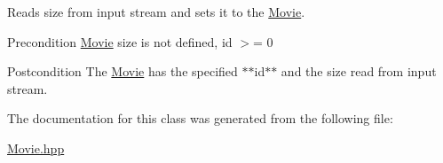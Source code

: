 Reads size from input stream and sets it to the \hyperlink{class_movie}{Movie}. 

\begin{DoxyPrecond}{Precondition}
\hyperlink{class_movie}{Movie} size is not defined, id $>$= 0 
\end{DoxyPrecond}
\begin{DoxyPostcond}{Postcondition}
The \hyperlink{class_movie}{Movie} has the specified $\ast$$\ast$id$\ast$$\ast$ and the size read from input stream. 
\end{DoxyPostcond}


The documentation for this class was generated from the following file:\begin{DoxyCompactItemize}
\item 
\hyperlink{_movie_8hpp}{Movie.hpp}\end{DoxyCompactItemize}
